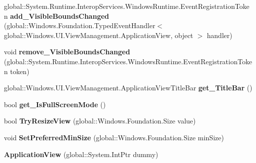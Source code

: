 \begin{DoxyCompactItemize}
global\+::\+System.\+Runtime.\+Interop\+Services.\+Windows\+Runtime.\+Event\+Registration\+Token {\bfseries add\+\_\+\+Visible\+Bounds\+Changed} (global\+::\+Windows.\+Foundation.\+Typed\+Event\+Handler$<$ global\+::\+Windows.\+U\+I.\+View\+Management.\+Application\+View, object $>$ handler)
\item 
\mbox{\label{class_windows_1_1_u_i_1_1_view_management_1_1_application_view_a3c9197225cd620a40c58179a49da3349}} 
void {\bfseries remove\+\_\+\+Visible\+Bounds\+Changed} (global\+::\+System.\+Runtime.\+Interop\+Services.\+Windows\+Runtime.\+Event\+Registration\+Token token)
\item 
\mbox{\label{class_windows_1_1_u_i_1_1_view_management_1_1_application_view_ab9b05a73da58fd42c06c39c87d3292d8}} 
global\+::\+Windows.\+U\+I.\+View\+Management.\+Application\+View\+Title\+Bar {\bfseries get\+\_\+\+Title\+Bar} ()
\item 
\mbox{\label{class_windows_1_1_u_i_1_1_view_management_1_1_application_view_afde1936ca2f8aded16b77720619151e5}} 
bool {\bfseries get\+\_\+\+Is\+Full\+Screen\+Mode} ()
\item 
\mbox{\label{class_windows_1_1_u_i_1_1_view_management_1_1_application_view_a239abe45572bb1478737b90836a4b386}} 
bool {\bfseries Try\+Resize\+View} (global\+::\+Windows.\+Foundation.\+Size value)
\item 
\mbox{\label{class_windows_1_1_u_i_1_1_view_management_1_1_application_view_a0578db6c17fe182700dc8c5cb8973a14}} 
void {\bfseries Set\+Preferred\+Min\+Size} (global\+::\+Windows.\+Foundation.\+Size min\+Size)
\item 
\mbox{\label{class_windows_1_1_u_i_1_1_view_management_1_1_application_view_a10e1e2089e594fe33f2e591fc465535c}} 
{\bfseries Application\+View} (global\+::\+System.\+Int\+Ptr dummy)
\item 
\mbox{\label{class_windows_1_1_u_i_1_1_view_management_1_1_application_view_ac9a73477b84f2c3e9e09660fdfe04e89}} 

\end{DoxyCompactItemize}
